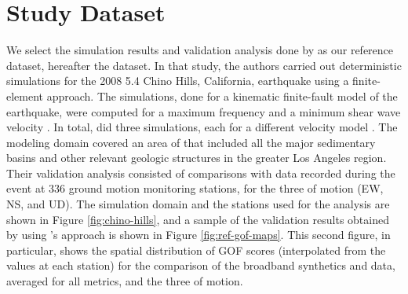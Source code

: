 
\section{Study Dataset}

We select the simulation results and validation analysis done by \citet{Taborda_2014_BSSA} as our reference dataset, hereafter the dataset. In that study, the authors carried out deterministic simulations for the 2008  5.4 Chino Hills, California, earthquake using a finite-element approach. The simulations, done for a kinematic finite-fault model of the earthquake, were computed for a maximum frequency  and a minimum shear wave velocity . In total, \citet{Taborda_2014_BSSA} did three simulations, each for a different velocity model \citep[CVM-S4, CVM-H, CVM-H+GTL, see][]{Small_2017_SRL}. The modeling domain covered an area of  that included all the major sedimentary basins and other relevant geologic structures in the greater Los Angeles region. Their validation analysis consisted of comparisons with data recorded during the event at 336 ground motion monitoring stations, for the three  of motion (EW, NS, and UD). The simulation domain and the stations used for the analysis are shown in Figure \ref{fig:chino-hills}, and a sample of the validation results obtained by \citet{Taborda_2014_BSSA} using \citeauthor{Anderson_2004_Proc}'s approach is shown in Figure \ref{fig:ref-gof-maps}. This second figure, in particular, shows the spatial distribution of GOF scores (interpolated from the values at each station) for the comparison of the broadband synthetics and data, averaged for all metrics, and the three  of motion.

